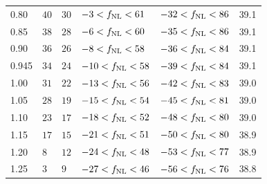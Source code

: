 \begin{table}
{\begin{tabular}{llllll}
0.80                                    & $    40$& $    30$& $    -3<f_{\rm NL}<    61$& $   -32<f_{\rm NL}<    86$ &   39.1\\
0.85                                    & $    38$& $    28$& $    -6<f_{\rm NL}<    60$& $   -35<f_{\rm NL}<    86$ &   39.1\\
0.90                                    & $    36$& $    26$& $    -8<f_{\rm NL}<    58$& $   -36<f_{\rm NL}<    84$ &   39.1\\
0.945                                   & $    34$& $    24$& $   -10<f_{\rm NL}<    58$& $   -39<f_{\rm NL}<    84$ &   39.1\\
1.00                                    & $    31$& $    22$& $   -13<f_{\rm NL}<    56$& $   -42<f_{\rm NL}<    83$ &   39.0\\
1.05                                    & $    28$& $    19$& $   -15<f_{\rm NL}<    54$& $   -45<f_{\rm NL}<    81$ &   39.0\\
1.10                                    & $    23$& $    17$& $   -18<f_{\rm NL}<    52$& $   -48<f_{\rm NL}<    80$ &   39.0\\
1.15                                    & $    17$& $    15$& $   -21<f_{\rm NL}<    51$& $   -50<f_{\rm NL}<    80$ &   38.9\\
1.20                                    & $     8$& $    12$& $   -24<f_{\rm NL}<    48$& $   -53<f_{\rm NL}<    77$ &   38.9\\
1.25                                    & $     3$& $     9$& $   -27<f_{\rm NL}<    46$& $   -56<f_{\rm NL}<    76$ &   38.8\\
    \end{tabular}}
\end{table}

